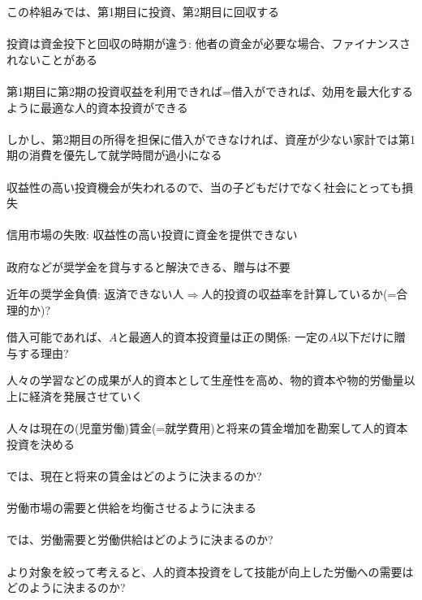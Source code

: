 \begin{frame}[t]{}
この枠組みでは、第1期目に投資、第2期目に回収する\\~\\
\pause
投資は資金投下と回収の時期が違う: 他者の資金が必要な場合、ファイナンスされないことがある\\~\\
\pause
第1期目に第2期の投資収益を利用できれば=借入ができれば、効用を最大化するように最適な人的資本投資ができる\\~\\
\pause
しかし、第2期目の所得を担保に借入ができなければ、資産が少ない家計では第1期の消費を優先して就学時間が過小になる\\~\\
\pause
収益性の高い投資機会が失われるので、当の子どもだけでなく社会にとっても損失\\~\\
\pause
信用市場の失敗: 収益性の高い投資に資金を提供できない\\~\\
\pause
政府などが奨学金を貸与すると解決できる、贈与は不要
\begin{dinglist}{43}
\vspace{1.0ex}\setlength{\itemsep}{1.0ex}\setlength{\baselineskip}{12pt}\footnotesize
\item	近年の奨学金負債: 返済できない人$\Rightarrow$人的投資の収益率を計算しているか(=合理的か)?
\item	借入可能であれば、$A$と最適人的資本投資量は正の関係: 一定の$A$以下だけに贈与する理由?
\end{dinglist}
\end{frame}

\begin{frame}[t]{}
人々の学習などの成果が人的資本として生産性を高め、物的資本や物的労働量以上に経済を発展させていく\\~\\
\pause
人々は現在の(児童労働)賃金(=就学費用)と将来の賃金増加を勘案して人的資本投資を決める\\~\\
\pause
では、現在と将来の賃金はどのように決まるのか?\\~\\
\pause
労働市場の需要と供給を均衡させるように決まる\\~\\
\pause
では、労働需要と労働供給はどのように決まるのか?\\~\\
\pause
より対象を絞って考えると、人的資本投資をして技能が向上した労働への需要はどのように決まるのか?
\end{frame}

